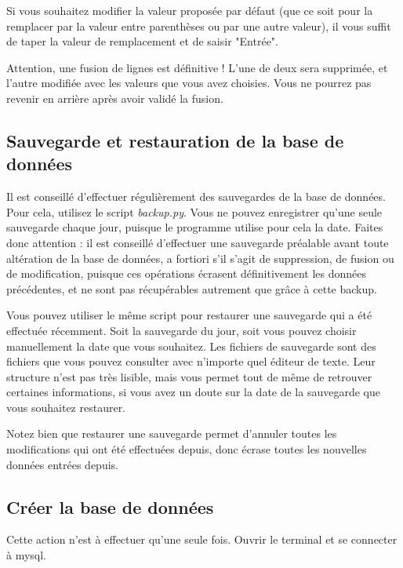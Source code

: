 \documentclass[12pt,a4paper]{article}
\begin{document}
    Si vous souhaitez modifier la valeur proposée par défaut (que ce soit pour la remplacer par la valeur
    entre parenthèses ou par une autre valeur), il vous suffit de taper la valeur de remplacement et de saisir
    "Entrée".

    Attention, une fusion de lignes est définitive ! L'une de deux sera supprimée, et l'autre modifiée avec les
    valeurs que vous avez choisies. Vous ne pourrez pas revenir en arrière après avoir validé la fusion.


\bigskip
\subsection{Sauvegarde et restauration de la base de données}
    
    Il est conseillé d'effectuer régulièrement des sauvegardes de la base de données.
    Pour cela, utilisez le script \emph{backup.py}. Vous ne pouvez enregistrer qu'une seule sauvegarde
    chaque jour, puisque le programme utilise pour cela la date. Faites donc attention : il est conseillé d'effectuer
    une sauvegarde préalable avant toute altération de la base de données, a fortiori s'il s'agit de suppression,
    de fusion ou de modification, puisque ces opérations écrasent définitivement les données précédentes, et ne sont
    pas récupérables autrement que grâce à cette backup.

    Vous pouvez utiliser le même script pour restaurer une sauvegarde qui a été effectuée récemment. Soit la sauvegarde
    du jour, soit vous pouvez choisir manuellement la date que vous souhaitez.
    Les fichiers de sauvegarde sont des fichiers que vous pouvez consulter avec n'importe quel éditeur de texte.
    Leur structure n'est pas très lisible, mais vous permet tout de même de retrouver certaines informations, si vous
    avez un doute sur la date de la sauvegarde que vous souhaitez restaurer.

    Notez bien que restaurer une sauvegarde permet d'annuler toutes les modifications qui ont été effectuées depuis,
    donc écrase toutes les nouvelles données entrées depuis.


\bigskip
\subsection{Créer la base de données}

    Cette action n'est à effectuer qu'une seule fois.
    Ouvrir le terminal %
    et se connecter à mysql.
    
\end{document}
